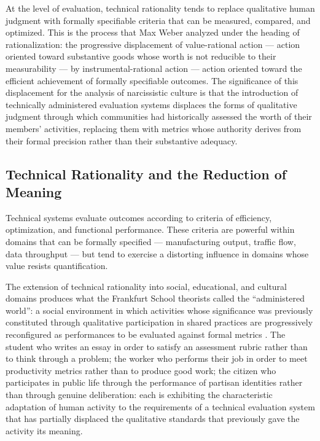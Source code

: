 \documentclass[12pt]{memoir}
\begin{document}
At the level of evaluation, technical rationality tends to replace qualitative human
judgment with formally specifiable criteria that can be measured, compared, and
optimized. This is the process that Max Weber analyzed under the heading of
rationalization: the progressive displacement of value-rational action — action
oriented toward substantive goods whose worth is not reducible to their measurability
— by instrumental-rational action — action oriented toward the efficient achievement
of formally specifiable outcomes. The significance of this displacement for the
analysis of narcissistic culture is that the introduction of technically administered
evaluation systems displaces the forms of qualitative judgment through which
communities had historically assessed the worth of their members' activities, replacing
them with metrics whose authority derives from their formal precision rather than their
substantive adequacy.

\subsection{Technical Rationality and the Reduction of Meaning}

Technical systems evaluate outcomes according to criteria of efficiency, optimization,
and functional performance. These criteria are powerful within domains that can be
formally specified — manufacturing output, traffic flow, data throughput — but tend to
exercise a distorting influence in domains whose value resists quantification.

The extension of technical rationality into social, educational, and cultural domains
produces what the Frankfurt School theorists called the \enquote{administered world}:
a social environment in which activities whose significance was previously constituted
through qualitative participation in shared practices are progressively reconfigured
as performances to be evaluated against formal metrics \citep{adorno1944dialectic}.
The student who writes an essay in order to satisfy an assessment rubric rather than
to think through a problem; the worker who performs their job in order to meet
productivity metrics rather than to produce good work; the citizen who participates in
public life through the performance of partisan identities rather than through genuine
deliberation: each is exhibiting the characteristic adaptation of human activity to
the requirements of a technical evaluation system that has partially displaced the
qualitative standards that previously gave the activity its meaning.
\end{document}
